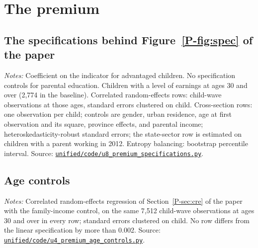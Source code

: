 \documentclass[11pt]{article}
\numberwithin{equation}{section}
\newcommand{\repourl}{https://github.com/JiachenJin1001/family-background-earnings-china}
\newcommand{\code}[1]{\href{\repourl/blob/main/#1}{\nolinkurl{#1}}}
\begin{document}
\section{The premium}
\label{oa:premium}

\subsection{The specifications behind Figure~\ref{P-fig:spec} of the paper}

\begin{table}[H]
\centering
\small
\caption{The premium across fifteen specifications.}
\label{oatab:grid}

\par\smallskip
\begin{minipage}{0.94\textwidth}
\footnotesize\emph{Notes:} Coefficient on the indicator for
advantaged children. No specification controls for parental education.
Children with a level of earnings at ages 30 and over (2,774 in the baseline). Correlated random-effects rows: child-wave observations at those ages, standard errors
clustered on child. Cross-section rows: one observation per child; controls are gender, urban residence, age at first observation and its
square, province effects, and parental income;
heteroskedasticity-robust standard errors; the state-sector row is
estimated on children with a parent working in 2012. Entropy balancing:
bootstrap percentile interval. Source:
\code{unified/code/u8_premium_specifications.py}.
\end{minipage}
\end{table}

\subsection{Age controls}

\begin{table}[H]
\centering
\small
\caption{The premium under alternative age controls.}
\label{oatab:age}

\par\smallskip
\begin{minipage}{0.9\textwidth}
\footnotesize\emph{Notes:} Correlated random-effects regression of
Section~\ref{P-sec:cre} of the paper with the family-income control, on
the same 7,512 child-wave observations at ages 30 and over in
every row; standard errors clustered on child. No row differs from the
linear specification by more than 0.002. Source:
\code{unified/code/u4_premium_age_controls.py}.
\end{minipage}
\end{table}
\end{document}
